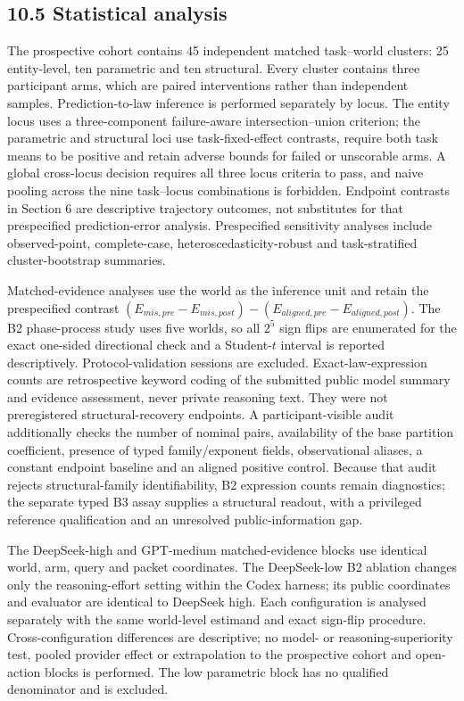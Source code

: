 \documentclass[10pt,twocolumn]{article}
\begin{document}
\subsection{10.5 Statistical analysis}\label{statistical-analysis}

The prospective cohort contains 45 independent matched task--world
clusters: 25 entity-level, ten parametric and ten structural. Every
cluster contains three participant arms, which are paired interventions
rather than independent samples. Prediction-to-law inference is
performed separately by locus. The entity locus uses a three-component
failure-aware intersection--union criterion; the parametric and
structural loci use task-fixed-effect contrasts, require both task means
to be positive and retain adverse bounds for failed or unscorable arms.
A global cross-locus decision requires all three locus criteria to pass,
and naive pooling across the nine task--locus combinations is forbidden.
Endpoint contrasts in Section 6 are descriptive trajectory outcomes, not
substitutes for that prespecified prediction-error analysis.
Prespecified sensitivity analyses include observed-point, complete-case,
heteroscedasticity-robust and task-stratified cluster-bootstrap
summaries.

Matched-evidence analyses use the world as the inference unit and retain
the prespecified contrast
\((E_{mis,pre}-E_{mis,post})-(E_{aligned,pre}-E_{aligned,post})\). The
B2 phase-process study uses five worlds, so all \(2^5\) sign flips are
enumerated for the exact one-sided directional check and a Student-\(t\)
interval is reported descriptively. Protocol-validation sessions are
excluded. Exact-law-expression counts are retrospective keyword coding
of the submitted public model summary and evidence assessment, never
private reasoning text. They were not preregistered structural-recovery
endpoints. A participant-visible audit additionally checks the number of
nominal pairs, availability of the base partition coefficient, presence
of typed family/exponent fields, observational aliases, a constant
endpoint baseline and an aligned positive control. Because that audit
rejects structural-family identifiability, B2 expression counts remain
diagnostics; the separate typed B3 assay supplies a structural readout,
with a privileged reference qualification and an unresolved
public-information gap.

The DeepSeek-high and GPT-medium matched-evidence blocks use identical
world, arm, query and packet coordinates. The DeepSeek-low B2 ablation
changes only the reasoning-effort setting within the Codex harness; its
public coordinates and evaluator are identical to DeepSeek high. Each
configuration is analysed separately with the same world-level estimand
and exact sign-flip procedure. Cross-configuration differences are
descriptive; no model- or reasoning-superiority test, pooled provider
effect or extrapolation to the prospective cohort and open-action blocks
is performed. The low parametric block has no qualified denominator and
is excluded.
\end{document}
